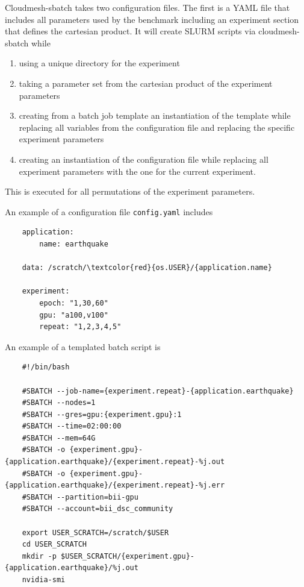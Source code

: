 \documentclass[utf8]{FrontiersinVancouver} %
\begin{document}
{Cloudmesh-sbatch takes two configuration files. The first is a YAML
file that includes all parameters used by the benchmark including an
experiment section that defines the cartesian product. It will create
SLURM scripts via cloudmesh-sbatch while

\begin{enumerate}
  \item using a unique directory for the experiment
  \item taking a parameter set from the cartesian product
    of the experiment parameters
  \item creating from a batch job template an instantiation of the
    template while replacing all variables from the configuration file
    and replacing the specific experiment parameters
  \item creating an instantiation of the configuration file while
    replacing all experiment parameters with the one for the current
    experiment.
\end{enumerate}

This is executed for all permutations of the experiment parameters.

An example of a configuration file \verb|config.yaml| includes

{\footnotesize
\begin{Verbatim}
    application:
        name: earthquake

    data: /scratch/\textcolor{red}{os.USER}/{application.name}
       
    experiment:
        epoch: "1,30,60"
        gpu: "a100,v100"
        repeat: "1,2,3,4,5"
\end{Verbatim}
}

An example of a templated batch script is

{\footnotesize
\begin{Verbatim}
    #!/bin/bash

    #SBATCH --job-name={experiment.repeat}-{application.earthquake}
    #SBATCH --nodes=1
    #SBATCH --gres=gpu:{experiment.gpu}:1
    #SBATCH --time=02:00:00
    #SBATCH --mem=64G
    #SBATCH -o {experiment.gpu}-{application.earthquake}/{experiment.repeat}-%j.out
    #SBATCH -o {experiment.gpu}-{application.earthquake}/{experiment.repeat}-%j.err
    #SBATCH --partition=bii-gpu
    #SBATCH --account=bii_dsc_community

    export USER_SCRATCH=/scratch/$USER
    cd USER_SCRATCH
    mkdir -p $USER_SCRATCH/{experiment.gpu}-{application.earthquake}/%j.out
    nvidia-smi


\end{Verbatim}}}
\end{document}
